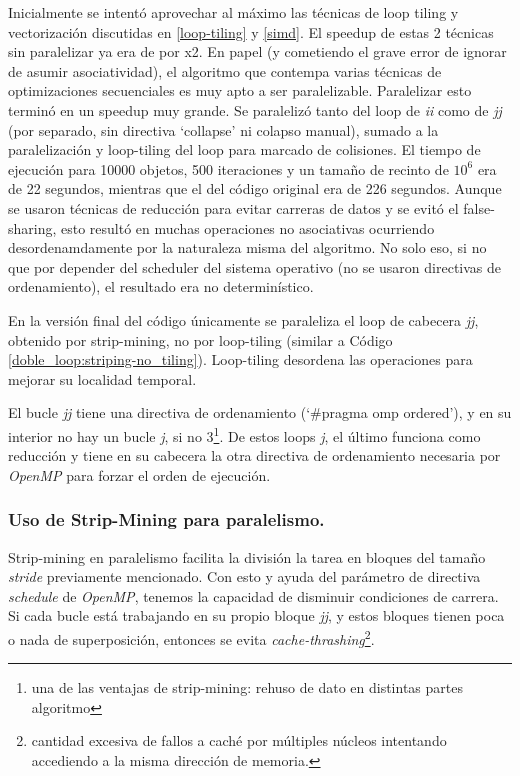 \documentclass{article}
\begin{document}
Inicialmente se intentó aprovechar al máximo las técnicas de loop tiling y vectorización discutidas
en \ref{loop-tiling} y \ref{simd}. El speedup de estas 2 técnicas sin paralelizar ya era de por x2. En
papel (y cometiendo el grave error de ignorar de asumir asociatividad), el algoritmo que contempa varias
técnicas de optimizaciones secuenciales es muy apto a ser paralelizable. Paralelizar esto terminó en un speedup muy grande.
Se paralelizó tanto del loop de \textit{ii} como de \textit{jj} (por separado, sin directiva `collapse' ni colapso manual),
sumado a la paralelización y loop-tiling del loop para marcado de colisiones. El tiempo de ejecución para 10000 objetos, 500 iteraciones y un
tamaño de recinto de $10^6$ era de 22 segundos, mientras que el del código original era de 226 segundos.
Aunque se usaron técnicas de reducción para evitar carreras de datos y se evitó el false-sharing, esto resultó en muchas operaciones
no asociativas ocurriendo desordenamdamente por la naturaleza misma del algoritmo. No solo eso, si no que
por depender del scheduler del sistema operativo (no se usaron directivas de ordenamiento), el resultado era no determinístico.


En la versión final del código únicamente se paraleliza el loop de cabecera \textit{jj}, obtenido
por strip-mining, no por loop-tiling (similar a Código \ref{doble_loop:striping-no_tiling}).
Loop-tiling desordena las operaciones para mejorar su localidad temporal.


El bucle \textit{jj} tiene una directiva de ordenamiento (`\#pragma omp ordered'), y en su interior
no hay un bucle \textit{j}, si no 3\footnote{una de las ventajas de strip-mining: rehuso de dato en distintas partes
algoritmo}. De estos loops \textit{j}, el último funciona como
reducción y tiene en su cabecera la otra directiva de ordenamiento necesaria por \textit{OpenMP}
para forzar el orden de ejecución.

\subsubsection{Uso de Strip-Mining para paralelismo.\label{strip-mining-parallel}}
Strip-mining en paralelismo facilita la división la tarea en bloques del tamaño \textit{stride}
previamente mencionado. Con esto y ayuda del parámetro de directiva \textit{schedule} de \textit{OpenMP},
tenemos la capacidad de disminuir condiciones de carrera. Si cada bucle está trabajando en su propio bloque
\textit{jj}, y estos bloques tienen poca o nada de superposición, entonces se evita
\textit{cache-thrashing}\footnote{cantidad excesiva de fallos a caché por múltiples núcleos intentando accediendo
a la misma dirección de memoria.}.
\end{document}
